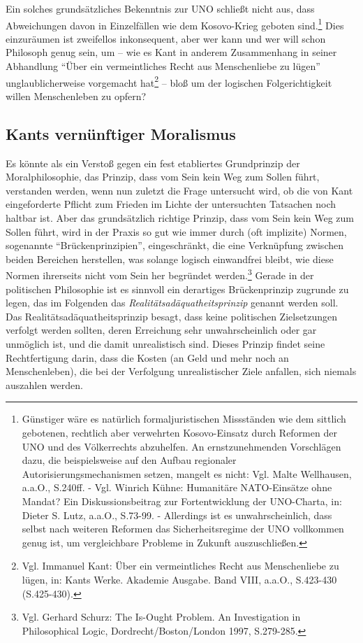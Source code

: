 \documentclass[12pt,a4paper,ngerman]{article}
\begin{document}
Ein solches grundsätzliches Bekenntnis zur UNO schließt nicht aus,
dass Abweichungen davon in Einzelfällen wie dem Kosovo-Krieg geboten
sind.\footnote{Günstiger wäre es natürlich formaljuristischen
  Missständen wie dem sittlich gebotenen, rechtlich aber verwehrten
  Kosovo-Einsatz durch Reformen der UNO und des Völkerrechts
  abzuhelfen. An ernstzunehmenden Vorschlägen dazu, die beispielsweise
  auf den Aufbau regionaler Autorisierungsmechanismen setzen, mangelt
  es nicht: Vgl. Malte Wellhausen, a.a.O., S.240ff. - Vgl. Winrich
  Kühne: Humanitäre NATO-Einsätze ohne Mandat? Ein Diskussionsbeitrag
  zur Fortentwicklung der UNO-Charta, in: Dieter S.  Lutz, a.a.O.,
  S.73-99. - Allerdings ist es unwahrscheinlich, dass selbst nach
  weiteren Reformen das Sicherheitsregime der UNO vollkommen genug
  ist, um vergleichbare Probleme in Zukunft auszuschließen.}  Dies
einzuräumen ist zweifellos inkonsequent, aber wer kann und wer will
schon Philosoph genug sein, um -- wie es Kant in anderem Zusammenhang
in seiner Abhandlung "`Über ein vermeintliches Recht aus Menschenliebe
zu lügen"' unglaublicherweise vorgemacht hat\footnote{Vgl. Immanuel
  Kant: Über ein vermeintliches Recht aus Menschenliebe zu lügen, in:
  Kants Werke. Akademie Ausgabe. Band VIII, a.a.O., S.423-430
  (S.425-430).}  -- bloß um der logischen Folgerichtigkeit willen
Menschenleben zu opfern?

\subsection{Kants vernünftiger Moralismus}

Es könnte als ein Verstoß gegen ein fest etabliertes Grundprinzip der
Moralphilosophie, das Prinzip, dass vom Sein kein Weg zum Sollen
führt, verstanden werden, wenn nun zuletzt die Frage untersucht wird,
ob die von Kant eingeforderte Pflicht zum Frieden im Lichte der
untersuchten Tatsachen noch haltbar ist. Aber das grundsätzlich
richtige Prinzip, dass vom Sein kein Weg zum Sollen führt, wird in der
Praxis so gut wie immer durch (oft implizite) Normen, sogenannte
"`Brückenprinzipien"', eingeschränkt, die eine Verknüpfung zwischen
beiden Bereichen herstellen, was solange logisch einwandfrei bleibt,
wie diese Normen ihrerseits nicht vom Sein her begründet
werden.\footnote{Vgl. Gerhard Schurz: The Is-Ought Problem. An
  Investigation in Philosophical Logic, Dordrecht/Boston/London 1997,
  S.279-285.} Gerade in der politischen Philosophie ist es sinnvoll
ein derartiges Brückenprinzip zugrunde zu legen, das im Folgenden das
{\em Realitätsadäquatheitsprinzip} genannt werden soll. Das
Realitätsadäquatheitsprinzip besagt, dass keine politischen
Zielsetzungen verfolgt werden sollten, deren Erreichung sehr
unwahrscheinlich oder gar unmöglich ist, und die damit unrealistisch
sind. Dieses Prinzip findet seine Rechtfertigung darin, dass die
Kosten (an Geld und mehr noch an Menschenleben), die bei der
Verfolgung unrealistischer Ziele anfallen, sich niemals auszahlen
werden.
\end{document}
